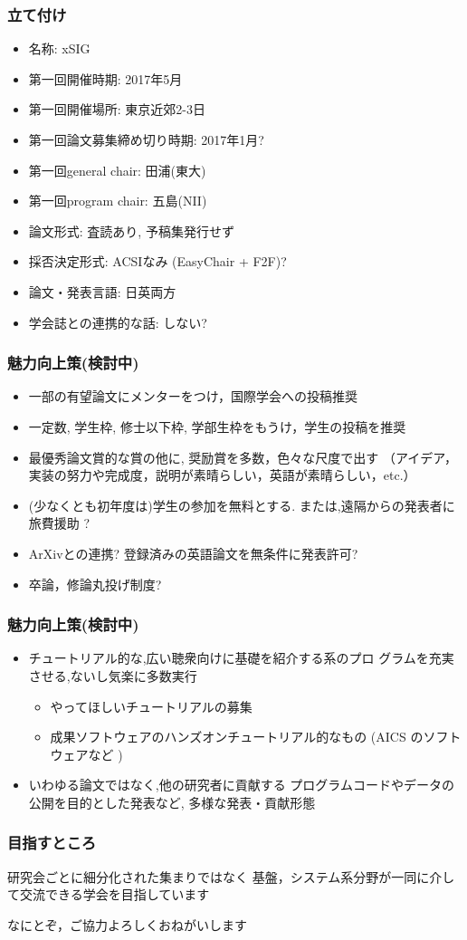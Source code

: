 \documentclass[12pt,dvipdfmx]{beamer}
\newcommand{\confname}{{xSIG}}
\newcommand{\firstconfdate}{\ao{2017年5月}}
\newcommand{\firstconfplace}{\ao{東京近郊}}
\newcommand{\firstdeadline}{\ao{2017年1月}}
\newcommand{\firstgeneralchair}{\ao{田浦(東大)}}
\newcommand{\firstprogramchair}{\ao{五島(NII)}}
\newcommand{\ao}[1]{{\color{blue}#1}}
\begin{document}
\begin{frame}
\frametitle{立て付け}
\begin{itemize}
\item 名称: \confname
\item 第一回開催時期: \firstconfdate 
\item 第一回開催場所: \firstconfplace 2-3日
\item 第一回論文募集締め切り時期: \firstdeadline ?
\item 第一回general chair: \firstgeneralchair
\item 第一回program chair: \firstprogramchair
\item 論文形式: \ao{査読あり, 予稿集発行せず}
\item 採否決定形式: \ao{ACSIなみ (EasyChair + F2F)?}
\item 論文・発表言語: \ao{日英両方}
\item 学会誌との連携的な話: \ao{しない?}
\end{itemize}
\end{frame}

\begin{frame}
\frametitle{魅力向上策(検討中)}
\begin{itemize}
\item 一部の有望論文に\ao{メンター}をつけ，国際学会への投稿推奨
\item 一定数, \ao{学生枠, 修士以下枠, 学部生枠}をもうけ，学生の投稿を推奨
\item 最優秀論文賞的な賞の他に, \ao{奨励賞を多数，色々な尺度}で出す
（アイデア，実装の努力や完成度，説明が素晴らしい，英語が素晴らしい，etc.）
\item (少なくとも初年度は)学生の参加を無料とする.
または,遠隔からの発表者に旅費援助 ?
\item \ao{ArXiv}との連携? 登録済みの英語論文を無条件に発表許可?
\item 卒論，修論\ao{丸投げ}制度?
\end{itemize}
\end{frame}


\begin{frame}
\frametitle{魅力向上策(検討中)}
\begin{itemize}
\item \ao{チュートリアル的}な,広い聴衆向けに基礎を紹介する系のプロ
グラムを充実させる,ないし気楽に多数実行
\begin{itemize}
\item やってほしいチュートリアルの\ao{募集}
\item \ao{成果ソフトウェアのハンズオン}チュートリアル的なもの 
  (AICS のソフトウェアなど )
\end{itemize}
\item いわゆる論文ではなく,他の研究者に貢献する
\ao{プログラムコードやデータ}の公開を目的とした発表など, 多様な発表・貢献形態
\end{itemize}
\end{frame}

\begin{frame}
\frametitle{目指すところ}
研究会ごとに細分化された集まりではなく
基盤，システム系分野が一同に介して交流できる学会を目指しています


{\huge なにとぞ，ご協力よろしくおねがいします}

\end{frame}
\end{document}
